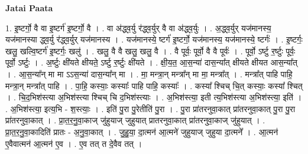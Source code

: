 \documentclass[17pt]{extarticle}
\begin{document}
\textbf{Jatai Paata} \newline

1. इ॒ष्टर्गो॒ वै वा इ॒ष्टर्ग॑ इ॒ष्टर्गो॒ वै । . वा अ॑द्ध्व॒र्यु र॑द्ध्व॒र्युर् वै वा अ॑द्ध्व॒र्युः । . अ॒द्ध्व॒र्युर् यज॑मानस्य॒ यज॑मानस्या द्ध्व॒र्यु र॑द्ध्व॒र्युर् यज॑मानस्य । . यज॑मानस्ये॒ ष्टर्ग॑ इ॒ष्टर्गो॒ यज॑मानस्य॒ यज॑मानस्ये॒ ष्टर्गः॑ । . इ॒ष्टर्गः॒ खलु॒ खल्वि॒ष्टर्ग॑ इ॒ष्टर्गः॒ खलु॑ । . खलु॒ वै वै खलु॒ खलु॒ वै । . वै पूर्वः॒ पूर्वो॒ वै वै पूर्वः॑ । . पूर्वो॒ ऽर्ष्टु र॒र्ष्टुः पूर्वः॒ पूर्वो॒ ऽर्ष्टुः । . अ॒र्ष्टुः क्षी॑यते क्षीयते॒ ऽर्ष्टु र॒र्ष्टुः क्षी॑यते । . क्षी॒य॒त॒ आ॒स॒न्या॑ दास॒न्या᳚त् क्षीयते क्षीयत आस॒न्या᳚त् । . आ॒स॒न्या᳚न् मा मा ऽऽस॒न्या॑ दास॒न्या᳚न् मा । . मा॒ मन्त्रा॒न् मन्त्रा᳚न् मा मा॒ मन्त्रा᳚त् । . मन्त्रा᳚त् पाहि पाहि॒ मन्त्रा॒न् मन्त्रा᳚त् पाहि । . पा॒हि॒ कस्याः॒ कस्याः᳚ पाहि पाहि॒ कस्याः᳚ । . कस्या᳚ श्चिच् चि॒त् कस्याः॒ कस्या᳚ श्चित् । . चि॒द॒भिश॑स्त्या अ॒भिश॑स्त्या श्चिच् चि द॒भिश॑स्त्याः । . अ॒भिश॑स्त्या॒ इती त्य॒भिश॑स्त्या अ॒भिश॑स्त्या॒ इति॑ । . अ॒भिश॑स्त्या॒ इत्य॒भि - श॒स्त्याः॒ । . इति॑ पु॒रा पु॒रेतीति॑ पु॒रा । . पु॒रा प्रा॑तरनुवा॒कात् प्रा॑तरनुवा॒कात् पु॒रा पु॒रा प्रा॑तरनुवा॒कात् । . प्रा॒त॒र॒नु॒वा॒काज् जु॑हुयाज् जुहुयात् प्रातरनुवा॒कात् प्रा॑तरनुवा॒काज् जु॑हुयात् । . प्रा॒त॒र॒नु॒वा॒कादिति॑ प्रातः - अ॒नु॒वा॒कात् । . जु॒हु॒या॒ दा॒त्मन॑ आ॒त्मने॑ जुहुयाज् जुहुया दा॒त्मने᳚ । . आ॒त्मन॑ ए॒वैवात्मन॑ आ॒त्मन॑ ए॒व । . ए॒व तत् त दे॒वैव तत् । \newline
\end{document}
